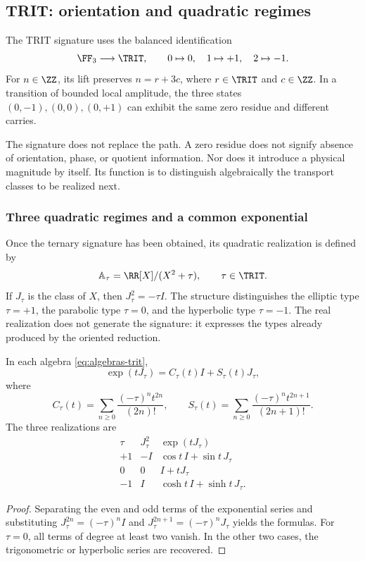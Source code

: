 \subsection{TRIT: orientation and quadratic regimes}

\begin{definition}
The TRIT signature uses the balanced identification
\[
 \FF_3\longrightarrow\TRIT,\qquad 0\mapsto0,\quad1\mapsto+1,\quad2\mapsto-1.
\]
For \(n\in\ZZ\), its lift preserves \(n=r+3c\), where \(r\in\TRIT\) and \(c\in\ZZ\). In a transition of bounded local amplitude, the three states \((0,-1),(0,0),(0,+1)\) can exhibit the same zero residue and different carries.
\end{definition}

The signature does not replace the path. A zero residue does not signify absence of orientation, phase, or quotient information. Nor does it introduce a physical magnitude by itself. Its function is to distinguish algebraically the transport classes to be realized next.

\subsubsection{Three quadratic regimes and a common exponential}

Once the ternary signature has been obtained, its quadratic realization is defined by
\begin{equation}
 \mathbb A_\tau=\RR[X]/(X^2+\tau),\qquad \tau\in\TRIT.
 \label{eq:algebras-trit}
\end{equation}
If \(J_\tau\) is the class of \(X\), then \(J_\tau^2=-\tau I\). The structure distinguishes the elliptic type \(\tau=+1\), the parabolic type \(\tau=0\), and the hyperbolic type \(\tau=-1\). The real realization does not generate the signature: it expresses the types already produced by the oriented reduction.

\begin{proposition}
In each algebra \eqref{eq:algebras-trit},
\begin{equation}
 \exp(tJ_\tau)=C_\tau(t)I+S_\tau(t)J_\tau,
\end{equation}
where
\[
 C_\tau(t)=\sum_{n\ge0}\frac{(-\tau)^nt^{2n}}{(2n)!},\qquad
 S_\tau(t)=\sum_{n\ge0}\frac{(-\tau)^nt^{2n+1}}{(2n+1)!}.
\]
The three realizations are
\[
 \begin{array}{c|c|c}
 \tau&J_\tau^2&\exp(tJ_\tau)\\\hline
 +1&-I&\cos t\,I+\sin t\,J_\tau\\
 0&0&I+tJ_\tau\\
 -1&I&\cosh t\,I+\sinh t\,J_\tau.
 \end{array}
\]
\end{proposition}
\begin{proof}
Separating the even and odd terms of the exponential series and substituting \(J_\tau^{2n}=(-\tau)^nI\) and \(J_\tau^{2n+1}=(-\tau)^nJ_\tau\) yields the formulas. For \(\tau=0\), all terms of degree at least two vanish. In the other two cases, the trigonometric or hyperbolic series are recovered.
\end{proof}

